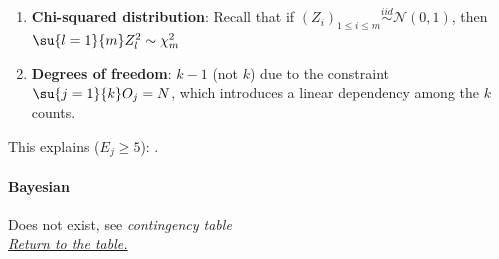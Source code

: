 \begin{enumerate}
        \textit{Step 3 -- }: Let $\sqrt{\bm{p}} = \left(\sqrt{p_i}\right)_{1\leq i\leq k}^T \in \mathbb{R}^k$ (column vector).
        The covariance matrix $\bm{\Sigma} \in \mathbb{R}^{k \times k}$ of $\bm{Z}$ is:
        $$\bm{\Sigma} = \bm{I}_k - \sqrt{\bm{p}}\sqrt{\bm{p}}^T$$
        where $\sqrt{\bm{p}}\sqrt{\bm{p}}^T$ is the outer product (a $k \times k$ matrix).\\
        Entries: $\bm{\Sigma}_{jj} = 1-p_j$ (diagonal), $\bm{\Sigma}_{jj'} = -\sqrt{p_jp_{j'}}$ (off-diagonal).

        \textit{Step 4 -- }: Since $\sqrt{\bm{p}}^T\sqrt{\bm{p}} = \su{j=1}{k}p_j = 1$ (a scalar):
        $$\bm{\Sigma}^2 = (\bm{I}_k - \sqrt{\bm{p}}\sqrt{\bm{p}}^T)^2
        = \bm{I}_k - 2\sqrt{\bm{p}}\sqrt{\bm{p}}^T + \sqrt{\bm{p}}\underbrace{(\sqrt{\bm{p}}^T\sqrt{\bm{p}})}_{=1}\sqrt{\bm{p}}^T
        = \bm{I}_k - \sqrt{\bm{p}}\sqrt{\bm{p}}^T = \bm{\Sigma}$$

        \textit{Step 5 -- }: .\\
        This is a special case of Cochran's theorem on quadratic forms of normal variables.\\
        Here $\text{rank}(\bm{\Sigma}) = \text{tr}(\bm{\Sigma}) = \su{j=1}{k}(1-p_j) = k - 1$.

        \textit{Conclusion}: The ``wrong'' normalization by $\sqrt{E_j}$ combined with the specific
        covariance structure yields an idempotent $\bm{\Sigma}$, which guarantees $\chi^2 \sim \chi^2_{k-1}$.
    \item \textbf{Chi-squared distribution}: Recall that if $\left(Z_i\right)_{1\leq i\leq m} \stackrel{iid}{\sim} \mathcal{N}(0,1)$, then
        $\su{l=1}{m}Z_l^2 \sim \chi^2_m$
    \item \textbf{Degrees of freedom}: $k-1$ (not $k$) due to the constraint $\su{j=1}{k}O_j = N$,
        which introduces a linear dependency among the $k$ counts.
\end{enumerate}
This explains  ($E_j \geq 5$): .

\paragraph{Bayesian}
Does not exist, see \emph{contingency table}\\
\textit{\hyperref[statistical_method_table]{Return to the table.}}


